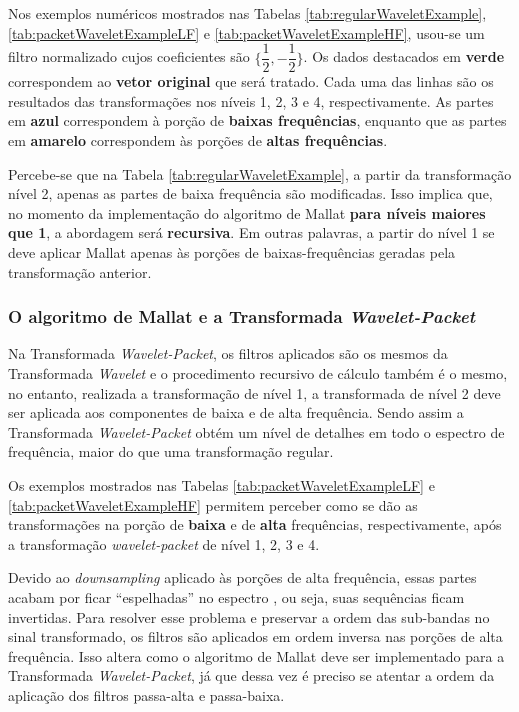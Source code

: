 			\par Nos exemplos numéricos mostrados nas Tabelas \autoref{tab:regularWaveletExample}, \autoref{tab:packetWaveletExampleLF} e \autoref{tab:packetWaveletExampleHF}, usou-se um filtro normalizado cujos coeficientes são $\{\dfrac{1}{2},-\dfrac{1}{2}\}$. Os dados destacados em \textbf{verde} correspondem ao \textbf{vetor original} que será tratado. Cada uma das linhas são os resultados das transformações nos níveis 1, 2, 3 e 4, respectivamente. As partes em \textbf{azul} correspondem à porção de \textbf{baixas frequências}, enquanto que as partes em \textbf{amarelo} correspondem às porções de \textbf{altas frequências}.
			
			\par Percebe-se que na Tabela \autoref{tab:regularWaveletExample}, a partir da transformação nível 2, apenas as partes de baixa frequência são modificadas. Isso implica que, no momento da implementação do algoritmo de Mallat \textbf{para níveis maiores que 1}, a abordagem será \textbf{recursiva}. Em outras palavras, a partir do nível 1 se deve aplicar Mallat apenas às porções de baixas-frequências geradas pela transformação anterior.
	
			
	
		\subsubsection{O algoritmo de Mallat e a Transformada \textit{Wavelet-Packet}}
			\par Na Transformada \textit{Wavelet-Packet}, os filtros aplicados são os mesmos da Transformada \textit{Wavelet} e o procedimento recursivo de cálculo também é o mesmo, no entanto, realizada a transformação de nível 1, a transformada de nível 2 deve ser aplicada aos componentes de baixa e de alta frequência. Sendo assim a Transformada \textit{Wavelet-Packet} obtém um nível de detalhes em todo o espectro de frequência, maior do que uma transformação regular. 
			
			\par Os exemplos mostrados nas Tabelas \autoref{tab:packetWaveletExampleLF} e \autoref{tab:packetWaveletExampleHF} permitem perceber como se dão as transformações na porção de \textbf{baixa} e de \textbf{alta} frequências, respectivamente, após a transformação \textit{wavelet-packet} de nível 1, 2, 3 e 4.
			
			\par Devido ao \textit{downsampling} aplicado às porções de alta frequência, essas partes acabam por ficar ``espelhadas'' no espectro \cite{Jensen_2001}, ou seja, suas sequências ficam invertidas. Para resolver esse problema e preservar a ordem das sub-bandas no sinal transformado, os filtros são aplicados em ordem inversa nas porções de alta frequência. Isso altera como o algoritmo de Mallat deve ser implementado para a Transformada \textit{Wavelet-Packet}, já que dessa vez é preciso se atentar a ordem da aplicação dos filtros passa-alta e passa-baixa.
	
